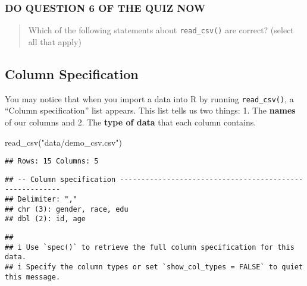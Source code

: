 \documentclass[
]{book}
\newenvironment{Shaded}{\begin{snugshade}}{\end{snugshade}}
\newcommand{\FunctionTok}[1]{\textcolor[rgb]{0.00,0.00,0.00}{#1}}
\newcommand{\NormalTok}[1]{#1}
\newcommand{\StringTok}[1]{\textcolor[rgb]{0.31,0.60,0.02}{#1}}
\begin{document}
\hypertarget{do-question-6-of-the-quiz-now}{%
\subsubsection{DO QUESTION 6 OF THE QUIZ NOW}\label{do-question-6-of-the-quiz-now}}

\begin{quote}
Which of the following statements about \texttt{read\_csv()} are correct? (select all that apply)
\end{quote}

\hypertarget{column-specification}{%
\subsection{Column Specification}\label{column-specification}}

You may notice that when you import a data into R by running \texttt{read\_csv()}, a ``Column specification'' list appears. This list tells us two things:
1. The \textbf{names} of our columns and
2. The \textbf{type of data} that each column contains.

\begin{Shaded}
\begin{Highlighting}[]
\FunctionTok{read\_csv}\NormalTok{(}\StringTok{"data/demo\_csv.csv"}\NormalTok{)}
\end{Highlighting}
\end{Shaded}

\begin{verbatim}
## Rows: 15 Columns: 5
\end{verbatim}

\begin{verbatim}
## -- Column specification --------------------------------------------------------
## Delimiter: ","
## chr (3): gender, race, edu
## dbl (2): id, age
\end{verbatim}

\begin{verbatim}
## 
## i Use `spec()` to retrieve the full column specification for this data.
## i Specify the column types or set `show_col_types = FALSE` to quiet this message.
\end{verbatim}
\end{document}
